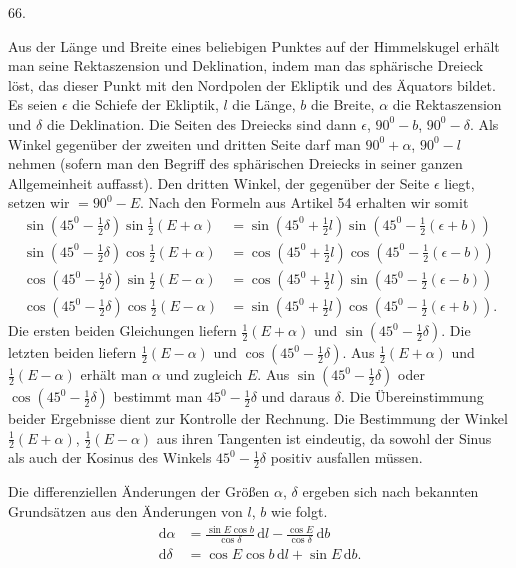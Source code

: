 \par{}\medskip
\hypertarget{native-085-article066}{}
\begin{center}66.\end{center}
Aus der Länge und Breite eines beliebigen Punktes auf der Himmelskugel erhält man seine Rektaszension und Deklination, indem man das sphärische Dreieck löst, das dieser Punkt mit den Nordpolen der Ekliptik und des Äquators bildet. Es seien $\epsilon$ die Schiefe der Ekliptik, $l$ die Länge, $b$ die Breite, $\alpha$ die Rektaszension und $\delta$ die Deklination. Die Seiten des Dreiecks sind dann $\epsilon$, $90^0-b$, $90^0-\delta$. Als Winkel gegenüber der zweiten und dritten Seite darf man $90^0+\alpha$, $90^0-l$ nehmen (sofern man den Begriff des sphärischen Dreiecks in seiner ganzen Allgemeinheit auffasst). Den dritten Winkel, der gegenüber der Seite $\epsilon$ liegt, setzen wir $=90^0-E$. Nach den Formeln aus Artikel 54 erhalten wir somit
\[
\begin{aligned}
\sin(45^0-\tfrac12\delta)\sin\tfrac12(E+\alpha)&=\sin(45^0+\tfrac12 l)\sin(45^0-\tfrac12(\epsilon+b))\\[.5em]
\sin(45^0-\tfrac12\delta)\cos\tfrac12(E+\alpha)&=\cos(45^0+\tfrac12 l)\cos(45^0-\tfrac12(\epsilon-b))\\[.5em]
\cos(45^0-\tfrac12\delta)\sin\tfrac12(E-\alpha)&=\cos(45^0+\tfrac12 l)\sin(45^0-\tfrac12(\epsilon-b))\\[.5em]
\cos(45^0-\tfrac12\delta)\cos\tfrac12(E-\alpha)&=\sin(45^0+\tfrac12 l)\cos(45^0-\tfrac12(\epsilon+b)).
\end{aligned}
\]
\noindent Die ersten beiden Gleichungen liefern $\tfrac12(E+\alpha)$ und $\sin(45^0-\tfrac12\delta)$. Die letzten beiden liefern $\tfrac12(E-\alpha)$ und $\cos(45^0-\tfrac12\delta)$. Aus $\tfrac12(E+\alpha)$ und $\tfrac12(E-\alpha)$ erhält man $\alpha$ und zugleich $E$. Aus $\sin(45^0-\tfrac12\delta)$ oder $\cos(45^0-\tfrac12\delta)$ bestimmt man $45^0-\tfrac12\delta$ und daraus $\delta$. Die Übereinstimmung beider Ergebnisse dient zur Kontrolle der Rechnung. Die Bestimmung der Winkel $\tfrac12(E+\alpha)$, $\tfrac12(E-\alpha)$ aus ihren Tangenten ist eindeutig, da sowohl der Sinus als auch der Kosinus des Winkels $45^0-\tfrac12\delta$ positiv ausfallen müssen.

Die differenziellen Änderungen der Größen $\alpha$, $\delta$ ergeben sich nach bekannten Grundsätzen aus den Änderungen von $l$, $b$ wie folgt.
\[
\begin{aligned}
\mathrm{d}\alpha&=\frac{\sin E\cos b}{\cos\delta}\,\mathrm{d}l-\frac{\cos E}{\cos\delta}\,\mathrm{d}b\\[.6em]
\mathrm{d}\delta&=\cos E\cos b\,\mathrm{d}l+\sin E\,\mathrm{d}b.
\end{aligned}
\]

